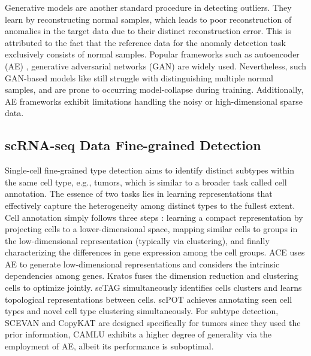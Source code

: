 \documentclass{article}
\begin{document}
Generative models are another standard procedure in detecting outliers. They learn by 
reconstructing normal samples, which leads to poor reconstruction of anomalies in 
the target data due to their distinct reconstruction error. This is attributed to the 
fact that the reference data for the anomaly detection task exclusively consists of 
normal samples.
Popular frameworks such as autoencoder (AE) \cite{odae}, generative adversarial 
networks (GAN) \cite{GANad} are widely used. Nevertheless, such GAN-based 
models like \cite{EffGAN} still struggle with distinguishing multiple normal samples, and are prone to 
occurring model-collapse during training. Additionally, AE frameworks exhibit limitations 
handling the noisy or high-dimensional sparse data.

\subsection{scRNA-seq Data Fine-grained Detection}
Single-cell fine-grained type detection aims to identify distinct subtypes within the same cell type, e.g., 
tumors, which is similar to a broader task called cell annotation. The essence of two 
tasks lies in learning representations that effectively capture the heterogeneity among 
distinct types to the fullest extent. Cell annotation simply follows three 
steps \cite{threestep}: learning a compact representation by projecting cells to a 
lower-dimensional space, mapping similar cells to groups in the low-dimensional 
representation (typically via clustering), and finally characterizing the differences in 
gene expression among the cell groups. ACE \cite{ACE} uses AE to generate 
low-dimensional representations and considers the intrinsic dependencies among genes. 
Kratos \cite{kratos} fuses the dimension reduction and clustering cells to 
optimize jointly. scTAG \cite{scTAG} simultaneously identifies cells clusters and 
learns topological representations between cells. scPOT \cite{scPOT} achieves 
annotating seen cell types and novel cell type clustering simultaneously. For subtype 
detection, SCEVAN \cite{SCEVAN} and CopyKAT \cite{CopyKAT} are designed 
specifically for tumors since they used the prior information, CAMLU \cite{CAMLU} 
exhibits a higher degree of generality via the employment of AE, albeit its performance is suboptimal. 
\end{document}
